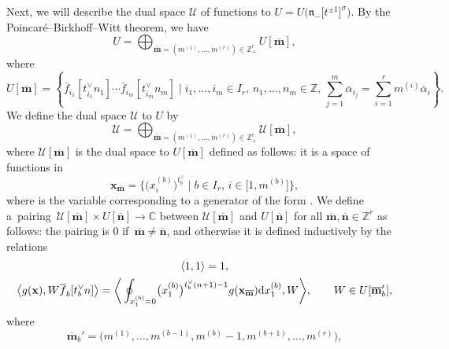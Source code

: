 \documentclass[10pt,a4paper]{amsart}
\numberwithin{equation}{section}
\begin{document}
Next, we will describe the dual space $\mathcal{U}$ of functions to $U=U\bigl(\mathfrak{n}_-\bigl[t^{\pm1}\bigr]^{\sigma}\bigr)$. By the Poincar\'e--Birkhoff--Witt theorem, we have
\begin{equation*}
U=\bigoplus_{\overline{\mathbf{m}}=(m^{(1)},\dots,m^{(r)})\in\mathbb{Z}_+^r}U[\overline{\mathbf{m}}],
\end{equation*}
where
\begin{equation*}
U[\overline{\mathbf{m}}]=\left\{\overline{f}_{i_1}[t_{i_1}^{\vee}n_1]\cdots\overline{f}_{i_m}[t_{i_m}^{\vee}n_m] \mid i_1,\dots,i_m\in I_r,\,n_1,\dots,n_m\in\mathbb{Z},\, \sum_{j=1}^m\overline{\alpha}_{i_j}=\sum_{i=1}^rm^{(i)} \overline{\alpha}_i\right\}.
\end{equation*}
We define the dual space $\mathcal{U}$ to $U$ by
\begin{equation*}
\mathcal{U}=\bigoplus_{\overline{\mathbf{m}}=(m^{(1)},\dots,m^{(r)})\in\mathbb{Z}_+^r}\mathcal{U}[\overline{\mathbf{m}}],
\end{equation*}
where $\mathcal{U}[\overline{\mathbf{m}}]$ is the dual space to $U[\overline{\mathbf{m}}]$ defined as follows: it is a space of functions in
\begin{equation*}
\mathbf{x}_{\overline{\mathbf{m}}}
=\bigl\{\bigl(x_i^{(b)}\bigr)^{t_b^{\vee}}\mid b\in I_r,\,i\in \bigl[1,m^{(b)}\bigr]\bigr\},
\end{equation*}
where  is the variable corresponding to a generator of the form . We define a~pairing~${\mathcal{U}[\overline{\mathbf{m}}]\times U[\overline{\mathbf{n}}]\to\mathbb{C}}$ between $\mathcal{U}[\overline{\mathbf{m}}]$ and $U[\overline{\mathbf{n}}]$ for all $\overline{\mathbf{m}},\overline{\mathbf{n}}\in \mathbb{Z}^r$ as follows: the pairing is $0$ if~${\overline{\mathbf{m}}\neq\overline{\mathbf{n}}}$, and otherwise it is defined inductively by the relations
\begin{gather*}
\langle 1,1\rangle =1,\\
\big\langle g(\mathbf{x}),W\overline{f}_b[t_b^{\vee}n]\big\rangle
=\bigg\langle\oint\nolimits_{x_1^{(b)}=0}\bigl(x_1^{(b)}\bigr) ^{t_b^{\vee}(n+1)-1} g(\mathbf{x}_{\overline{\mathbf{m}}}) {\rm d}x_1^{(b)},W\bigg\rangle, \qquad W\in U[\overline{\mathbf{m}}_b'],
\end{gather*}
where
\begin{equation*}
\overline{\mathbf{m}}_b'=\bigl(m^{(1)},\dots,m^{(b-1)}, m^{(b)}-1,m^{(b+1)},\dots,m^{(r)}\bigr),
\end{equation*}
\end{document}
